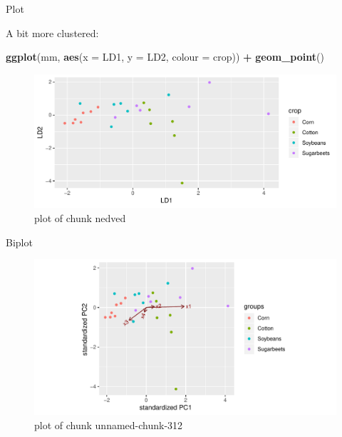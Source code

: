 \documentclass[ignorenonframetext,]{beamer}
\newenvironment{Shaded}{\begin{snugshade}}{\end{snugshade}}
\newcommand{\DataTypeTok}[1]{\textcolor[rgb]{0.13,0.29,0.53}{#1}}
\newcommand{\KeywordTok}[1]{\textcolor[rgb]{0.13,0.29,0.53}{\textbf{#1}}}
\newcommand{\NormalTok}[1]{#1}
\newcommand{\OperatorTok}[1]{\textcolor[rgb]{0.81,0.36,0.00}{\textbf{#1}}}
\newcommand{\StringTok}[1]{\textcolor[rgb]{0.31,0.60,0.02}{#1}}
\begin{document}
\begin{frame}[fragile]{Plot}
\protect\hypertarget{plot}{}

A bit more clustered:

\begin{Shaded}
\begin{Highlighting}[]
\KeywordTok{ggplot}\NormalTok{(mm, }\KeywordTok{aes}\NormalTok{(}\DataTypeTok{x =}\NormalTok{ LD1, }\DataTypeTok{y =}\NormalTok{ LD2, }\DataTypeTok{colour =}\NormalTok{ crop)) }\OperatorTok{+}
\StringTok{  }\KeywordTok{geom_point}\NormalTok{()}
\end{Highlighting}
\end{Shaded}

\begin{figure}
\centering
\includegraphics{figure/nedved-1.pdf}
\caption{plot of chunk nedved}
\end{figure}

\end{frame}

\begin{frame}[fragile]{Biplot}
\protect\hypertarget{biplot-2}{}

\begin{Shaded}
\end{Shaded}

\begin{figure}
\centering
\includegraphics{figure/unnamed-chunk-312-1.pdf}
\caption{plot of chunk unnamed-chunk-312}
\end{figure}

\end{frame}
\end{document}
